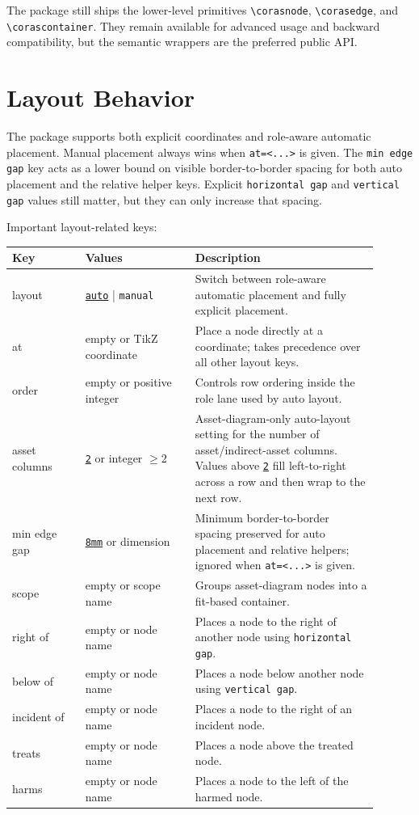 \documentclass[a4paper]{article}
\newcommand{\keydefault}[1]{\underline{\texttt{#1}}}
\begin{document}
The package still ships the lower-level primitives
\texttt{\textbackslash corasnode}, \texttt{\textbackslash corasedge}, and
\texttt{\textbackslash corascontainer}. They remain available for advanced
usage and backward compatibility, but the semantic wrappers are the preferred
public API.

\section{Layout Behavior}

The package supports both explicit coordinates and role-aware automatic
placement. Manual placement always wins when \texttt{at=<...>} is given.
The \texttt{min edge gap} key acts as a lower bound on visible
border-to-border spacing for both auto placement and the relative helper keys.
Explicit \texttt{horizontal gap} and \texttt{vertical gap} values still matter,
but they can only increase that spacing.

Important layout-related keys:

\begin{center}
\begin{tabular}{>{\ttfamily}p{0.18\linewidth}p{0.27\linewidth}p{0.45\linewidth}}
\hline
Key & Values & Description \\
\hline
layout & \keydefault{auto} | \texttt{manual} & Switch between role-aware automatic placement and fully explicit placement. \\
at & empty or TikZ coordinate & Place a node directly at a coordinate; takes precedence over all other layout keys. \\
order & empty or positive integer & Controls row ordering inside the role lane used by auto layout. \\
asset columns & \keydefault{2} or integer $\ge 2$ & Asset-diagram-only auto-layout setting for the number of asset/indirect-asset columns. Values above \keydefault{2} fill left-to-right across a row and then wrap to the next row. \\
min edge gap & \keydefault{8mm} or dimension & Minimum border-to-border spacing preserved for auto placement and relative helpers; ignored when \texttt{at=<...>} is given. \\
scope & empty or scope name & Groups asset-diagram nodes into a fit-based container. \\
right of & empty or node name & Places a node to the right of another node using \texttt{horizontal gap}. \\
below of & empty or node name & Places a node below another node using \texttt{vertical gap}. \\
incident of & empty or node name & Places a node to the right of an incident node. \\
treats & empty or node name & Places a node above the treated node. \\
harms & empty or node name & Places a node to the left of the harmed node. \\
\hline
\end{tabular}
\end{center}
\end{document}
